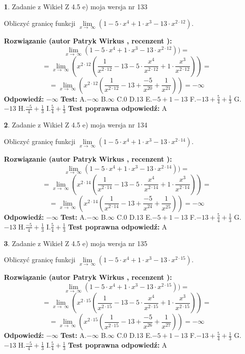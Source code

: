 \documentclass[12pt, a4paper]{article}
\theoremstyle{definition} %
\newtheorem{zad}{}
\newcommand{\zadStart}[1]{\begin{zad}#1\newline}
\newcommand{\zadStop}{\end{zad}}
\newcommand{\rozwStart}[2]{\noindent \textbf{Rozwiązanie (autor #1 , recenzent #2): }\newline}
\newcommand{\rozwStop}{\newline}
\newcommand{\odpStart}{\noindent \textbf{Odpowiedź:}\newline}
\newcommand{\odpStop}{\newline}
\newcommand{\testStart}{\noindent \textbf{Test:}\newline}
\newcommand{\testStop}{\newline}
\newcommand{\kluczStart}{\noindent \textbf{Test poprawna odpowiedź:}\newline}
\newcommand{\kluczStop}{\newline}
\begin{document}
\zadStart{Zadanie z Wikieł Z 4.5 e) moja wersja nr 133}



Obliczyć granicę funkcji  $\lim\limits_{x\to\ \infty}(1 - 5 \cdot x^{4}+1 \cdot x^{3}- 13 \cdot x^{2\cdot12})$.
\zadStop
\rozwStart{Patryk Wirkus}{}
$$\lim\limits_{x\to\ \infty}(1 - 5 \cdot x^{4}+1 \cdot x^{3}- 13 \cdot x^{2\cdot12}))=$$
$$=\lim\limits_{x\to\ \infty}(x^{2\cdot12}(\frac{1}{x^{2\cdot12}}-13 -5 \cdot \frac{x^{4}}{x^{2\cdot12}}+1 \cdot \frac{x^{3}}{x^{2\cdot12}}))=$$
$$=\lim\limits_{x\to\ \infty}(x^{2\cdot12}(\frac{1}{x^{2\cdot12}}-13 + \frac{-5}{x^{20}}+ \frac{1}{x^{21}}))=-\infty$$
\rozwStop
\odpStart
$-\infty$
\odpStop
\testStart
A.$-\infty$ B.$\infty$ C.$0$ D.$13$ E.$-5 + 1 - 13$
F.$-13+\frac{5}{4}+\frac{1}{3}$ G.$-13$
H.$\frac{-5}{4}+\frac{1}{3}$
I.$\frac{5}{4}+\frac{1}{3}$
\testStop
\kluczStart
A
\kluczStop



\zadStart{Zadanie z Wikieł Z 4.5 e) moja wersja nr 134}



Obliczyć granicę funkcji  $\lim\limits_{x\to\ \infty}(1 - 5 \cdot x^{4}+1 \cdot x^{3}- 13 \cdot x^{2\cdot14})$.
\zadStop
\rozwStart{Patryk Wirkus}{}
$$\lim\limits_{x\to\ \infty}(1 - 5 \cdot x^{4}+1 \cdot x^{3}- 13 \cdot x^{2\cdot14}))=$$
$$=\lim\limits_{x\to\ \infty}(x^{2\cdot14}(\frac{1}{x^{2\cdot14}}-13 -5 \cdot \frac{x^{4}}{x^{2\cdot14}}+1 \cdot \frac{x^{3}}{x^{2\cdot14}}))=$$
$$=\lim\limits_{x\to\ \infty}(x^{2\cdot14}(\frac{1}{x^{2\cdot14}}-13 + \frac{-5}{x^{24}}+ \frac{1}{x^{25}}))=-\infty$$
\rozwStop
\odpStart
$-\infty$
\odpStop
\testStart
A.$-\infty$ B.$\infty$ C.$0$ D.$13$ E.$-5 + 1 - 13$
F.$-13+\frac{5}{4}+\frac{1}{3}$ G.$-13$
H.$\frac{-5}{4}+\frac{1}{3}$
I.$\frac{5}{4}+\frac{1}{3}$
\testStop
\kluczStart
A
\kluczStop



\zadStart{Zadanie z Wikieł Z 4.5 e) moja wersja nr 135}



Obliczyć granicę funkcji  $\lim\limits_{x\to\ \infty}(1 - 5 \cdot x^{4}+1 \cdot x^{3}- 13 \cdot x^{2\cdot15})$.
\zadStop
\rozwStart{Patryk Wirkus}{}
$$\lim\limits_{x\to\ \infty}(1 - 5 \cdot x^{4}+1 \cdot x^{3}- 13 \cdot x^{2\cdot15}))=$$
$$=\lim\limits_{x\to\ \infty}(x^{2\cdot15}(\frac{1}{x^{2\cdot15}}-13 -5 \cdot \frac{x^{4}}{x^{2\cdot15}}+1 \cdot \frac{x^{3}}{x^{2\cdot15}}))=$$
$$=\lim\limits_{x\to\ \infty}(x^{2\cdot15}(\frac{1}{x^{2\cdot15}}-13 + \frac{-5}{x^{26}}+ \frac{1}{x^{27}}))=-\infty$$
\rozwStop
\odpStart
$-\infty$
\odpStop
\testStart
A.$-\infty$ B.$\infty$ C.$0$ D.$13$ E.$-5 + 1 - 13$
F.$-13+\frac{5}{4}+\frac{1}{3}$ G.$-13$
H.$\frac{-5}{4}+\frac{1}{3}$
I.$\frac{5}{4}+\frac{1}{3}$
\testStop
\kluczStart
A
\kluczStop
\end{document}
